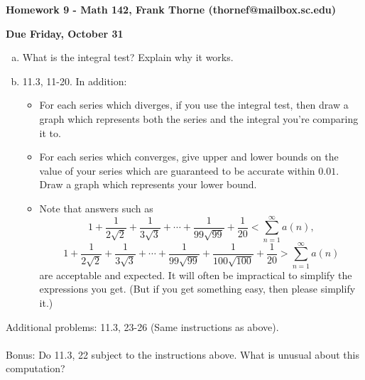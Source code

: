 \documentclass[12pt]{article}
\begin{document}
\setlength{\topmargin}{-2mm}





\begin{center}{\bf Homework 9 - Math 142, Frank Thorne (thornef@mailbox.sc.edu)}
\end{center}
\begin{center}
{\bf Due Friday, October 31}
\end{center}

\begin{enumerate}[(a)]

\item
What is the integral test? Explain why it works.

\item
11.3, 11-20. In addition:
\begin{itemize}
\item
For each series which diverges, if you use the integral test, then draw a graph which represents
both the series and the integral you're comparing it to.
\item
For each series which converges, give upper and lower bounds on the value of your series which are
guaranteed to be accurate within $0.01$. Draw a graph which represents your lower bound.
\item
Note that answers such as
\[
1 + \frac{1}{2 \sqrt{2}} + \frac{1}{3 \sqrt{3}} + \cdots + \frac{1}{99 \sqrt{99}} + \frac{1}{20} <
\sum_{n = 1}^{\infty} a(n),
\]
\[
1 + \frac{1}{2 \sqrt{2}} + \frac{1}{3 \sqrt{3}} + \cdots + \frac{1}{99 \sqrt{99}} + \frac{1}{100 \sqrt{100}} +
\frac{1}{20} >
\sum_{n = 1}^{\infty} a(n)
\]
are acceptable and expected. It will often be impractical to simplify the expressions you get. (But if you get
something easy, then please simplify it.)
\end{itemize}

\end{enumerate}
Additional problems:
11.3, 23-26 (Same instructions as above).
\\
\\
Bonus: Do 11.3, 22 subject to the instructions above. What is unusual about this computation?
\end{document}
